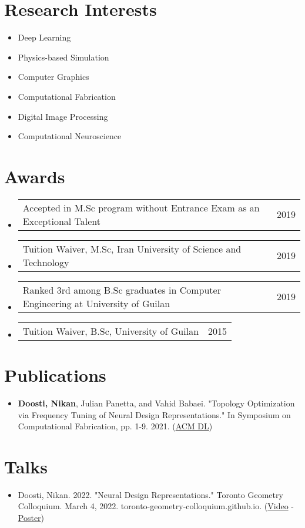\documentclass[letterpaper,11pt]{article}
\makeatletter
\newcommand{\resumeItem}[1]{
  \item\small{
    {#1 \vspace{-2pt}}
  }
}
\newcommand{\awarditem}[2]{
  \item
    \begin{tabular*}{0.97\textwidth}{l@{\extracolsep{\fill}}r}
      #1 & #2 \\ 
    \end{tabular*}\vspace{-5pt}
}
\newcommand{\resumeSubHeadingListStart}{\begin{itemize}[leftmargin=*]}
\newcommand{\resumeSubHeadingListEnd}{\end{itemize}}
\newcommand{\awarditemListStart}{\begin{itemize}[leftmargin=*]}
\newcommand{\awarditemListEnd}{\end{itemize}\vspace{-5pt}}
\makeatother
\begin{document}
\section{Research Interests}
  \resumeSubHeadingListStart
    \resumeItem{Deep Learning}
    \vspace{-5pt}
    \resumeItem{Physics-based Simulation}
    \vspace{-5pt}
    \resumeItem{Computer Graphics} 
    \vspace{-5pt}
    \resumeItem{Computational Fabrication}
    \vspace{-5pt}
    \resumeItem{Digital Image Processing}
   \vspace{-5pt}
   \resumeItem{Computational Neuroscience}
  \resumeSubHeadingListEnd
  

\section{Awards}
\awarditemListStart
  \awarditem{Accepted in M.Sc program without Entrance Exam as an Exceptional Talent}{2019}
  \awarditem{Tuition Waiver, M.Sc, Iran University of Science and Technology}{2019}
  \awarditem{Ranked 3rd among B.Sc graduates in Computer Engineering at University of Guilan}{2019}
  \awarditem{Tuition Waiver, B.Sc, University of Guilan}{2015}
\awarditemListEnd

\section{Publications}
 \resumeSubHeadingListStart
   \resumeItem{\textbf{Doosti, Nikan}, Julian Panetta, and Vahid Babaei. "Topology Optimization via Frequency Tuning of Neural Design Representations." In Symposium on Computational Fabrication, pp. 1-9. 2021. (\href{https://dl.acm.org/doi/abs/10.1145/3485114.3485124}{ACM DL})}
\resumeSubHeadingListEnd

\section{Talks}
 \resumeSubHeadingListStart
   \resumeItem{Doosti, Nikan. 2022. "Neural Design Representations." Toronto Geometry Colloquium. March 4, 2022. toronto-geometry-colloquium.github.io. (\href{https://youtu.be/FdPwG2kNv0M}{Video} - \href{https://toronto-geometry-colloquium.github.io/posters/tgc_poster_035.pdf}{Poster})} 
\resumeSubHeadingListEnd
\end{document}

